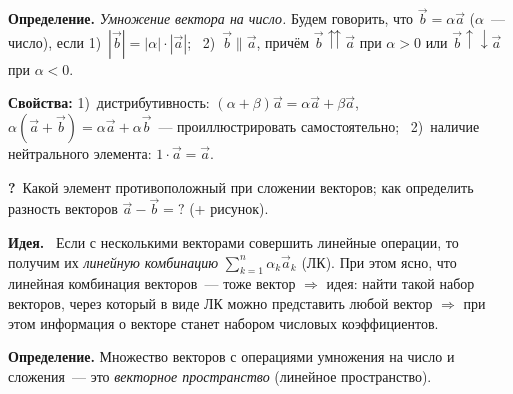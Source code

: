 \documentclass[a4paper,11pt]{article}
\newcommand{\lead}[1]{\textbf{\color{leadcol}#1}\ }
\newcommand{\q}{\textbf{\color{red!70!black}?}\ }
\begin{document}
\begin{opr}
\textbf{Определение.} \emph{Умножение вектора на число.} Будем говорить, что $\vec b=\alpha\vec a$
($\alpha$~--- число), если
1)~$|\vec b|=|\alpha|\cdot|\vec a|$; \
2)~$\vec b\parallel\vec a$, причём $\vec b\upuparrows\vec a$ при $\alpha>0$ или $\vec b\uparrow\downarrow\vec a$
при $\alpha<0$.
\end{opr}
\begin{center}
\end{center}
\textbf{Свойства:} 1)~дистрибутивность: $(\alpha+\beta)\vec a=\alpha\vec a+\beta\vec a$, \
$\alpha(\vec a+\vec b)=\alpha\vec a+\alpha\vec b$~--- проиллюстрировать самостоятельно;
\ 2)~наличие нейтрального элемента: $1\cdot\vec a=\vec a$.

\q Какой элемент противоположный при сложении векторов; как определить разность векторов
$\vec a-\vec b=?$ (+ рисунок).

\lead{Идея.} Если с несколькими векторами совершить линейные операции, то получим их \emph{линейную
комбинацию} $\sum_{k=1}^{n}\alpha_k\vec a_k$ (ЛК). При этом ясно, что линейная комбинация
векторов~--- тоже вектор $\Rightarrow$ идея: найти такой набор векторов, через который в виде ЛК можно
представить любой вектор $\Rightarrow$ при этом информация о векторе станет набором числовых
коэффициентов.

\begin{opr}
\textbf{Определение.} Множество векторов с операциями умножения на число и сложения~--- это
\emph{векторное пространство} (линейное пространство).
\end{opr}
\end{document}
